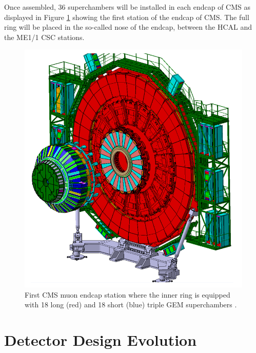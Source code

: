     Once assembled, 36 superchambers will be installed in each endcap of CMS as displayed in Figure \ref{fig:II-1-wheel} showing the first station of the endcap of CMS. The full ring will be placed in the so-called nose of the endcap, between the HCAL and the ME1/1 CSC stations.

    \begin{figure}[p]
      \centering
      \includegraphics[width=\textwidth]{img/II-1-gem/wheel.png}
      \caption{First CMS muon endcap station where the inner ring is equipped with 18 long (red) and 18 short (blue) triple GEM superchambers \cite{Colaleo:2021453}.}
      \label{fig:II-1-wheel}
    \end{figure}

  \section{Detector Design Evolution}

